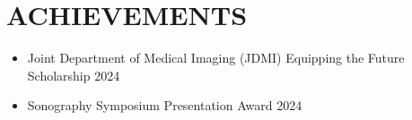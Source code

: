 
\section{\textcolor{airforceblue}{ACHIEVEMENTS}}
    \begin{itemize}[leftmargin=0.15in, itemsep=0pt, parsep=0pt]
        \item Joint Department of Medical Imaging (JDMI) Equipping the Future Scholarship \hfill 2024
        \item Sonography Symposium Presentation Award \hfill 2024
    \end{itemize}

\vspace{-12pt}
